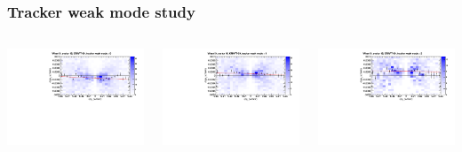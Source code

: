 \documentclass[compress]{beamer}
\begin{document}
\begin{frame}
\frametitle{Tracker weak mode study}

\begin{columns}
\includegraphics[width=\linewidth]{weakmode_times0.pdf}

\includegraphics[width=\linewidth]{weakmode_times1.pdf}

\includegraphics[width=\linewidth]{weakmode_times2.pdf}


\end{columns}
\end{frame}
\end{document}
